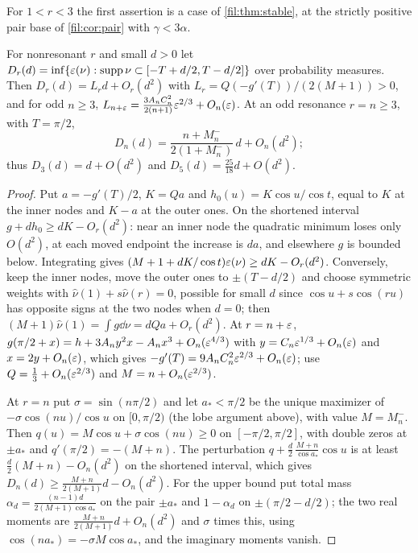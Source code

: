 For $1<r<3$ the first assertion is a case of \cref{fil:thm:stable}, at the strictly positive pair base
of \cref{fil:cor:pair} with $\gamma<3\alpha$.

\begin{theorem}\label{rec:thm:twoshort}
For nonresonant $r$ and small $d>0$ let $D_r(d)=\inf\{\varepsilon(\nu):\operatorname{supp}\nu\subset[-T+d/2,T-d/2]\}$ over
probability measures. Then $D_r(d)=L_rd+O_r(d^2)$ with $L_r=Q(-g'(T))/(2(M+1))>0$, and for odd $n\ge3$,
$L_{n+\varepsilon}=\frac{3A_nC_n^2}{2(n+1)}\varepsilon^{2/3}+O_n(\varepsilon)$. At an odd resonance $r=n\ge3$, with $T=\pi/2$,
\[
 D_n(d)=\frac{n+M_n^-}{2(1+M_n^-)}\,d+O_n(d^2);
\]
thus $D_3(d)=d+O(d^2)$ and $D_5(d)=\tfrac{25}{18}d+O(d^2)$.
\end{theorem}

\begin{proof}
Put $a=-g'(T)/2$, $K=Qa$ and $h_0(u)=K\cos u/\cos t$, equal to $K$ at the inner nodes and $K-a$ at the outer
ones. On the shortened interval $g+dh_0\ge dK-O_r(d^2)$: near an inner node the quadratic minimum loses
only $O(d^2)$, at each moved endpoint the increase is $da$, and elsewhere $g$ is bounded below.
Integrating gives $(M+1+dK/\cos t)\varepsilon(\nu)\ge dK-O_r(d^2)$. Conversely, keep the inner nodes, move the outer
ones to $\pm(T-d/2)$ and choose symmetric weights with $\widehat\nu(1)+s\widehat\nu(r)=0$, possible for small $d$ since
$\cos u+s\cos(ru)$ has opposite signs at the two nodes when $d=0$; then $(M+1)\widehat\nu(1)=\int g\dd\nu=dQa+O_r(d^2)$.
At $r=n+\varepsilon$, $g(\pi/2+x)=h+3A_ny^2x-A_nx^3+O_n(\varepsilon^{4/3})$ with $y=C_n\varepsilon^{1/3}+O_n(\varepsilon)$ and $x=2y+O_n(\varepsilon)$,
which gives $-g'(T)=9A_nC_n^2\varepsilon^{2/3}+O_n(\varepsilon)$; use $Q=\tfrac13+O_n(\varepsilon^{2/3})$ and $M=n+O_n(\varepsilon^{2/3})$.

At $r=n$ put $\sigma=\sin(n\pi/2)$ and let $a_*<\pi/2$ be the unique maximizer of $-\sigma\cos(nu)/\cos u$ on
$[0,\pi/2)$ (the lobe argument above), with value $M=M_n^-$. Then $q(u)=M\cos u+\sigma\cos(nu)\ge0$ on
$[-\pi/2,\pi/2]$, with double zeros at $\pm a_*$ and $q'(\pi/2)=-(M+n)$. The perturbation
$q+\tfrac d2\,\frac{M+n}{\cos a_*}\cos u$ is at least $\tfrac d2(M+n)-O_n(d^2)$ on the shortened interval,
which gives $D_n(d)\ge\frac{M+n}{2(M+1)}d-O_n(d^2)$. For the upper bound put total mass
$\alpha_d=\frac{(n-1)d}{2(M+1)\cos a_*}$ on the pair $\pm a_*$ and $1-\alpha_d$ on $\pm(\pi/2-d/2)$; the two
real moments are $\frac{M+n}{2(M+1)}d+O_n(d^2)$ and $\sigma$ times this, using
$\cos(na_*)=-\sigma M\cos a_*$, and the imaginary moments vanish.
\end{proof}

